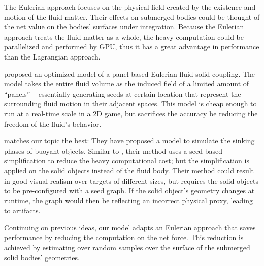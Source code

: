 The Eulerian approach focuses on the physical field created by the existence and motion of the fluid matter.
Their effects on submerged bodies could be thought of the net value on the bodies' surfaces under integration.
Because the Eulerian approach treats the fluid matter as a whole, the heavy computation could be parallelized and performed by GPU, thus it has a great advantage in performance than the Lagrangian approach.

\cite{GER13} proposed an optimized model of a panel-based Eulerian fluid-solid coupling.
The model takes the entire fluid volume as the induced field of a limited amount of ``panels'' -- essentially generating seeds at certain location that represent the surrounding fluid motion in their adjacent spaces.
This model is cheap enough to run at a real-time scale in a 2D game, but sacrifices the accuracy be reducing the freedom of the fluid's behavior.

\cite{BAJ20} matches our topic the best:
They have proposed a model to simulate the sinking phases of buoyant objects.
Similar to \cite{GER13}, their method uses a seed-based simplification to reduce the heavy computational cost; but the simplification is applied on the solid objects instead of the fluid body.
Their method could result in good visual realism over targets of different sizes, but requires the solid objects to be pre-configured with a seed graph.
If the solid object's geometry changes at runtime, the graph would then be reflecting an incorrect physical proxy, leading to artifacts.

Continuing on previous ideas, our model adapts an Eulerian approach that saves performance by reducing the computation on the net force.
This reduction is achieved by estimating over random samples over the surface of the submerged solid bodies' geometries.